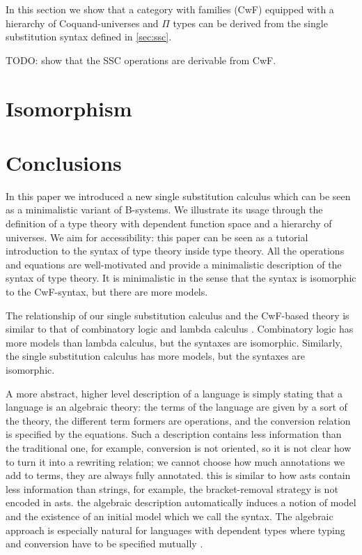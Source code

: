 \documentclass[sigplan,10pt,anonymous,review]{acmart}\settopmatter{printfolios=true,printccs=false,printacmref=false}
\begin{document}
In this section we show that a category with families (CwF) equipped
with a hierarchy of Coquand-universes and $\Pi$ types can be derived
from the single substitution syntax defined in \autoref{sec:ssc}.

TODO: show that the SSC operations are derivable from CwF.

\section{Isomorphism}
\label{sec:iso}

\section{Conclusions}
\label{sec:conclusion}

In this paper we introduced a new single substitution calculus which
can be seen as a minimalistic variant of B-systems. We illustrate its
usage through the definition of a type theory with dependent function
space and a hierarchy of universes. We aim for accessibility: this
paper can be seen as a tutorial introduction to the syntax of type
theory inside type theory. All the operations and equations are
well-motivated and provide a minimalistic description of the syntax of
type theory. It is minimalistic in the sense that the syntax is
isomorphic to the CwF-syntax, but there are more models. 

The relationship of our single substitution calculus and the CwF-based
theory is similar to that of combinatory logic and lambda calculus
\cite{DBLP:conf/fscd/AltenkirchKSV23}. Combinatory logic has more
models than lambda calculus, but the syntaxes are
isomorphic. Similarly, the single substitution calculus has more
models, but the syntaxes are isomorphic.

A more abstract, higher level description of a language is simply
stating that a language is an algebraic theory: the terms of the
language are given by a sort of the theory, the different term formers
are operations, and the conversion relation is specified by the
equations. Such a description contains less information than the
traditional one, for example, conversion is not oriented, so it is not
clear how to turn it into a rewriting relation; we cannot choose how
much annotations we add to terms, they are always fully
annotated. this is similar to how asts contain less information than
strings, for example, the bracket-removal strategy is not encoded in
asts. the algebraic description automatically induces a notion of
model and the existence of an initial model
\cite{DBLP:journals/pacmpl/KaposiKA19} which we call the syntax. The
algebraic approach is especially natural for languages with dependent
types where typing and conversion have to be specified mutually
\cite{DBLP:conf/popl/AltenkirchK16}.
\end{document}
